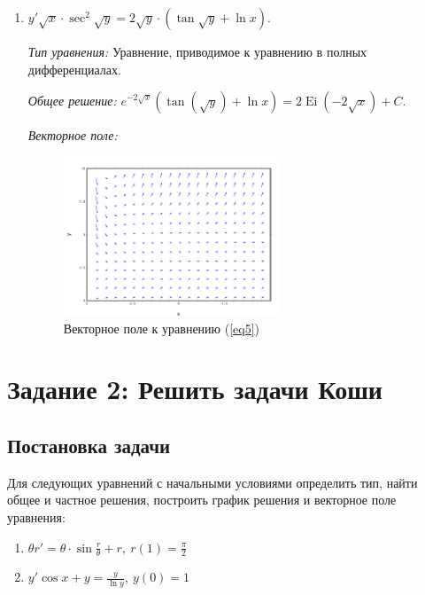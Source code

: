 \documentclass[14pt, a4paper, titlepage, fleqn]{extarticle}
\DeclareMathOperator{\Ei}{Ei}
\begin{document}
\begin{enumerate}
                \item 
                \(
                    y' \sqrt{x} \cdot \sec^2{\sqrt{y}} = 2\sqrt{y} \cdot 
                    \left( \tan{\sqrt{y}+\ln{x}} \right).
                \)
                \label{eq5}

                \textit{Тип уравнения:}
                Уравнение, приводимое к уравнению в полных дифференциалах.

                \textit{Общее решение:}
                \(
                    \displaystyle
                    e^{-2\sqrt{x}}\left( \tan(\sqrt{y}) + \ln{x} \right) = 2\Ei(-2 \sqrt{x}) + C.
                \)

                \textit{Векторное поле:}

                \begin{figure}[H]
                    \centering
                    \includegraphics[width=6.5cm]{pictures/vector_field_5.pdf}
                    \caption{Векторное поле к уравнению (\ref{eq5})}
                \end{figure}
            \end{enumerate}

    
    \pagebreak

    \section{Задание 2: Решить задачи Коши}

        \subsection{Постановка задачи}
            Для следующих уравнений с начальными условиями определить тип, найти
            общее и частное решения, построить график решения и векторное поле уравнения:
        
            \begin{enumerate}
                \item
                \(
                    \displaystyle
                    \theta r' = \theta \cdot \sin{\frac{r}{\theta}} + r, ~ r(1) = \frac{\pi}{2}
                \)

                \item 
                \(
                    \displaystyle
                    y' \cos{x} + y = \frac{y}{\ln{y}}, ~ y(0) = 1 
                \)
            \end{enumerate}
\end{document}

